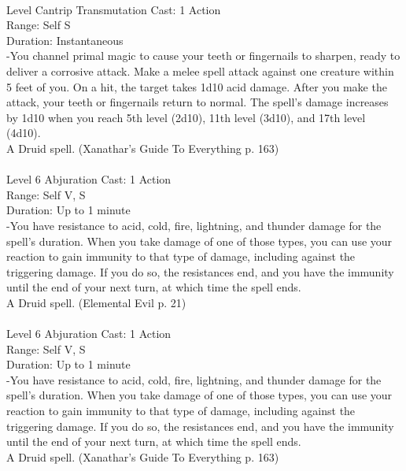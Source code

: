 \documentclass[10pt,twocolumn]{report}
\begin{document}
 \\
Level Cantrip \quad Transmutation \quad Cast: 1 Action\\
Range: Self \quad S\\
Duration: Instantaneous \quad \\
-You channel primal magic to cause your teeth or fingernails to sharpen, ready to deliver a corrosive attack. Make a melee spell attack against one creature within 5 feet of you. On a hit, the target takes 1d10 acid damage. After you make the attack, your teeth or fingernails return to normal. The spell’s damage increases by 1d10 when you reach 5th level (2d10), 11th level (3d10), and 17th level (4d10).\\
A Druid spell. (Xanathar's Guide To Everything p. 163) \\


 \\
Level 6 \quad Abjuration \quad Cast: 1 Action\\
Range: Self \quad V, S\\
Duration: Up to 1 minute \quad \\
-You have resistance to acid, cold, fire, lightning, and thunder damage for the spell’s duration.
When you take damage of one of those types, you can use your reaction to gain immunity to that type
of damage, including against the triggering damage. If you do so, the resistances end, and you have the immunity until the end of your next turn, at which time the spell ends.\\
A Druid spell. (Elemental Evil p. 21) \\


 \\
Level 6 \quad Abjuration \quad Cast: 1 Action\\
Range: Self \quad V, S\\
Duration: Up to 1 minute \quad \\
-You have resistance to acid, cold, fire, lightning, and thunder damage for the spell’s duration. When you take damage of one of those types, you can use your reaction to gain immunity to that type of damage, including against the triggering damage. If you do so, the resistances end, and you have the immunity until the end of your next turn, at which time the spell ends.\\
A Druid spell. (Xanathar's Guide To Everything p. 163) \\
\end{document}
